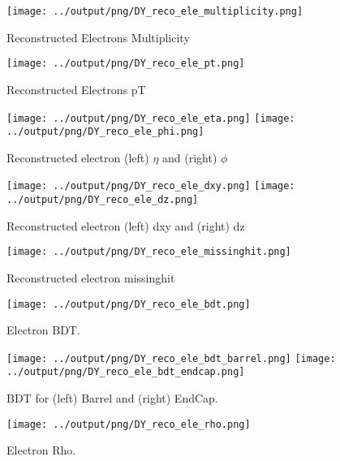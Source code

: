 \documentclass[11pt]{book}
\begin{document}
\begin{figure}[ht]
\centering
\texttt{[image: ../output/png/DY\_reco\_ele\_multiplicity.png]}
\caption{Reconstructed Electrons Multiplicity}
\label{fig:dy_reco_ele_multiplicity}
\end{figure}

\begin{figure}[ht]
\centering
\texttt{[image: ../output/png/DY\_reco\_ele\_pt.png]}
\caption{Reconstructed Electrons pT}
\label{fig:dy_reco_ele_pt}
\end{figure}

\begin{figure}[ht]
\centering
\texttt{[image: ../output/png/DY\_reco\_ele\_eta.png]}
\texttt{[image: ../output/png/DY\_reco\_ele\_phi.png]}
\caption{Reconstructed electron (left) $\eta$ and (right) $\phi$}
\label{fig:dy_reco_ele_eta_phi}
\end{figure}

\begin{figure}[ht]
\centering
\texttt{[image: ../output/png/DY\_reco\_ele\_dxy.png]}
\texttt{[image: ../output/png/DY\_reco\_ele\_dz.png]}
\caption{Reconstructed electron (left) dxy and (right) dz}
\label{fig:dy_reco_ele_dxy_dz}
\end{figure}

\begin{figure}[ht]
\centering
\texttt{[image: ../output/png/DY\_reco\_ele\_missinghit.png]}
\caption{Reconstructed electron missinghit}
\label{fig:dy_reco_ele_missinghit}
\end{figure}

\begin{figure}[ht]
\centering
\texttt{[image: ../output/png/DY\_reco\_ele\_bdt.png]}
\caption{Electron BDT.}
\label{fig:dy_reco_ele_bdt}
\end{figure}

\begin{figure}[ht]
\centering
\texttt{[image: ../output/png/DY\_reco\_ele\_bdt\_barrel.png]}
\texttt{[image: ../output/png/DY\_reco\_ele\_bdt\_endcap.png]}
\caption{BDT for (left) Barrel and (right) EndCap.}
\label{fig:dy_reco_ele_bdt_regions}
\end{figure}

\begin{figure}[ht]
\centering
\texttt{[image: ../output/png/DY\_reco\_ele\_rho.png]}
\caption{Electron Rho.}
\label{fig:dy_reco_ele_rho}
\end{figure}
\end{document}
